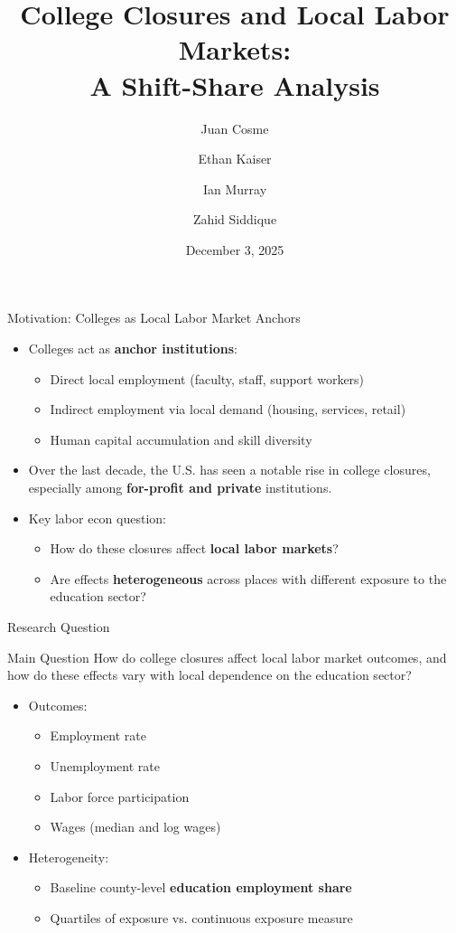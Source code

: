 \documentclass[aspectratio=169]{beamer}
\title[College Closures \& Local Labor Markets]{College Closures and Local Labor Markets:\\A Shift-Share Analysis}
\author{Juan Cosme \and Ethan Kaiser \and Ian Murray \and Zahid Siddique}
\institute[USF]{Department of Economics\\University of South Florida}
\date{December 3, 2025}
\begin{document}
\begin{frame}
  \titlepage
\end{frame}

\begin{frame}{Motivation: Colleges as Local Labor Market Anchors}
  \begin{itemize}
    \item Colleges act as \textbf{anchor institutions}:
      \begin{itemize}
        \item Direct local employment (faculty, staff, support workers)
        \item Indirect employment via local demand (housing, services, retail)
        \item Human capital accumulation and skill diversity
      \end{itemize}
    \item Over the last decade, the U.S. has seen a notable rise in college closures,
    especially among \textbf{for-profit and private} institutions.
    \item Key labor econ question:
      \begin{itemize}
        \item How do these closures affect \textbf{local labor markets}?
        \item Are effects \textbf{heterogeneous} across places with different exposure to the education sector?
      \end{itemize}
  \end{itemize}
\end{frame}

\begin{frame}{Research Question}
  \begin{block}{Main Question}
    How do college closures affect local labor market outcomes, and how do these
    effects vary with local dependence on the education sector?
  \end{block}
  \vspace{0.3cm}
  \begin{itemize}
    \item Outcomes:
      \begin{itemize}
        \item Employment rate
        \item Unemployment rate
        \item Labor force participation
        \item Wages (median and log wages)
      \end{itemize}
    \item Heterogeneity:
      \begin{itemize}
        \item Baseline county-level \textbf{education employment share}
        \item Quartiles of exposure vs. continuous exposure measure
      \end{itemize}
  \end{itemize}
\end{frame}
\end{document}
